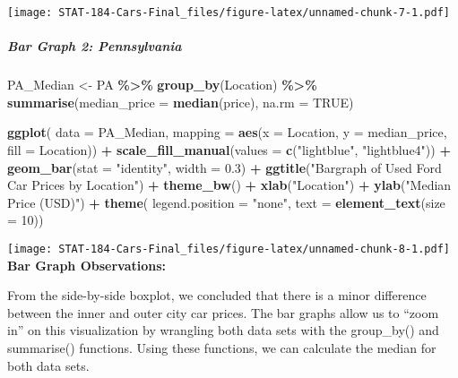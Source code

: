 \documentclass[
]{article}
\newenvironment{Shaded}{\begin{snugshade}}{\end{snugshade}}
\newcommand{\AttributeTok}[1]{\textcolor[rgb]{0.13,0.29,0.53}{#1}}
\newcommand{\ConstantTok}[1]{\textcolor[rgb]{0.56,0.35,0.01}{#1}}
\newcommand{\DecValTok}[1]{\textcolor[rgb]{0.00,0.00,0.81}{#1}}
\newcommand{\FloatTok}[1]{\textcolor[rgb]{0.00,0.00,0.81}{#1}}
\newcommand{\FunctionTok}[1]{\textcolor[rgb]{0.13,0.29,0.53}{\textbf{#1}}}
\newcommand{\NormalTok}[1]{#1}
\newcommand{\OtherTok}[1]{\textcolor[rgb]{0.56,0.35,0.01}{#1}}
\newcommand{\SpecialCharTok}[1]{\textcolor[rgb]{0.81,0.36,0.00}{\textbf{#1}}}
\newcommand{\StringTok}[1]{\textcolor[rgb]{0.31,0.60,0.02}{#1}}
\begin{document}
\texttt{[image: STAT-184-Cars-Final\_files/figure-latex/unnamed-chunk-7-1.pdf]}

\hypertarget{bar-graph-2-pennsylvania}{%
\subparagraph{Bar Graph 2:
Pennsylvania}\label{bar-graph-2-pennsylvania}}

\begin{Shaded}
\begin{Highlighting}[]
\NormalTok{PA\_Median }\OtherTok{\textless{}{-}} 
\NormalTok{  PA }\SpecialCharTok{\%\textgreater{}\%}
  \FunctionTok{group\_by}\NormalTok{(Location) }\SpecialCharTok{\%\textgreater{}\%}
  \FunctionTok{summarise}\NormalTok{(}\AttributeTok{median\_price =} \FunctionTok{median}\NormalTok{(price), }\AttributeTok{na.rm =} \ConstantTok{TRUE}\NormalTok{)}

\FunctionTok{ggplot}\NormalTok{(}
\AttributeTok{data =}\NormalTok{ PA\_Median,}
\AttributeTok{mapping =} \FunctionTok{aes}\NormalTok{(}\AttributeTok{x =}\NormalTok{ Location, }\AttributeTok{y =}\NormalTok{ median\_price, }\AttributeTok{fill =}\NormalTok{ Location)) }\SpecialCharTok{+}
  \FunctionTok{scale\_fill\_manual}\NormalTok{(}\AttributeTok{values =} \FunctionTok{c}\NormalTok{(}\StringTok{"lightblue"}\NormalTok{, }\StringTok{"lightblue4"}\NormalTok{)) }\SpecialCharTok{+}
  \FunctionTok{geom\_bar}\NormalTok{(}\AttributeTok{stat =} \StringTok{"identity"}\NormalTok{, }\AttributeTok{width =} \FloatTok{0.3}\NormalTok{) }\SpecialCharTok{+}
  \FunctionTok{ggtitle}\NormalTok{(}\StringTok{"Bargraph of Used Ford Car Prices by Location"}\NormalTok{) }\SpecialCharTok{+}
  \FunctionTok{theme\_bw}\NormalTok{() }\SpecialCharTok{+}
  \FunctionTok{xlab}\NormalTok{(}\StringTok{"Location"}\NormalTok{) }\SpecialCharTok{+}
  \FunctionTok{ylab}\NormalTok{(}\StringTok{"Median Price (USD)"}\NormalTok{) }\SpecialCharTok{+}
  \FunctionTok{theme}\NormalTok{(}
  \AttributeTok{legend.position =} \StringTok{"none"}\NormalTok{,}
  \AttributeTok{text =} \FunctionTok{element\_text}\NormalTok{(}\AttributeTok{size =} \DecValTok{10}\NormalTok{))}
\end{Highlighting}
\end{Shaded}

\texttt{[image: STAT-184-Cars-Final\_files/figure-latex/unnamed-chunk-8-1.pdf]}
\textbf{Bar Graph Observations:}

From the side-by-side boxplot, we concluded that there is a minor
difference between the inner and outer city car prices. The bar graphs
allow us to ``zoom in'' on this visualization by wrangling both data
sets with the group\_by() and summarise() functions. Using these
functions, we can calculate the median for both data sets.
\end{document}
